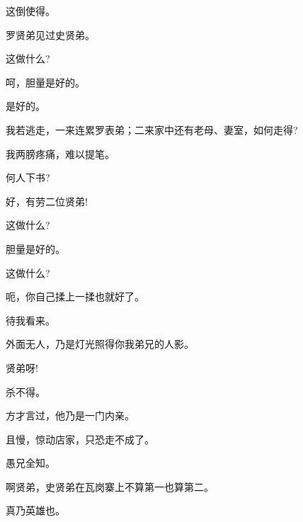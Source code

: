 {{这倒使得。

罗贤弟见过史贤弟。

这做什么?

呵，胆量是好的。

是好的。

我若逃走，一来连累罗表弟；二来家中还有老母、妻室，如何走得?

我两膀疼痛，难以提笔。

何人下书?

好，有劳二位贤弟!


这做什么?

胆量是好的。


这做什么?

呃，你自己揉上一揉也就好了。


待我看来。

外面无人，乃是灯光照得你我弟兄的人影。


贤弟呀!


杀不得。

方才言过，他乃是一门内亲。

且慢，惊动店家，只恐走不成了。

愚兄全知。

啊贤弟，史贤弟在瓦岗寨上不算第一也算第二。

真乃英雄也。


}}
